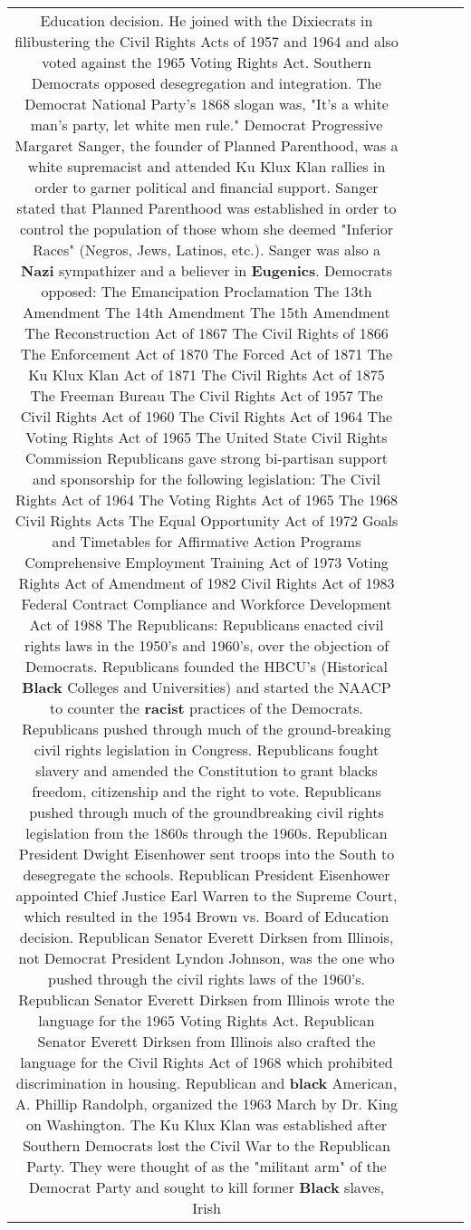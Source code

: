 \documentclass[11pt]{article}
\newlength\mylength
\begin{document}
\begin{center}
\begin{longtable}{|C{.65\mylength}|C{.30\mylength}|C{.12\mylength}|C{.12\mylength}|C{.12\mylength}|}
Education decision. He joined with the Dixiecrats in filibustering the Civil Rights Acts of 1957 and 1964 and also voted against the 1965 Voting Rights Act. Southern Democrats opposed desegregation and integration. The Democrat National Party's 1868 slogan was, "It's a white man's party, let white men rule." Democrat Progressive Margaret Sanger, the founder of Planned Parenthood, was a white supremacist and attended Ku Klux Klan rallies in order to garner political and financial support. Sanger stated that Planned Parenthood was established in order to control the population of those whom she deemed "Inferior Races" (Negros, Jews, Latinos, etc.). Sanger was also a \textbf{Nazi} sympathizer and a believer in \textbf{Eugenics}. Democrats opposed: The Emancipation Proclamation The 13th Amendment The 14th Amendment The 15th Amendment The Reconstruction Act of 1867 The Civil Rights of 1866 The Enforcement Act of 1870 The Forced Act of 1871 The Ku Klux Klan Act of 1871 The Civil Rights Act of 1875 The Freeman Bureau The Civil Rights Act of 1957 The Civil Rights Act of 1960 The Civil Rights Act of 1964 The Voting Rights Act of 1965 The United State Civil Rights Commission Republicans gave strong bi-partisan support and sponsorship for the following legislation: The Civil Rights Act of 1964 The Voting Rights Act of 1965 The 1968 Civil Rights Acts The Equal Opportunity Act of 1972 Goals and Timetables for Affirmative Action Programs Comprehensive Employment Training Act of 1973 Voting Rights Act of Amendment of 1982 Civil Rights Act of 1983 Federal Contract Compliance and Workforce Development Act of 1988 The Republicans: Republicans enacted civil rights laws in the 1950's and 1960's, over the objection of Democrats. Republicans founded the HBCU's (Historical \textbf{Black} Colleges and Universities) and started the NAACP to counter the \textbf{racist} practices of the Democrats. Republicans pushed through much of the ground-breaking civil rights legislation in Congress. Republicans fought slavery and amended the Constitution to grant blacks freedom, citizenship and the right to vote. Republicans pushed through much of the groundbreaking civil rights legislation from the 1860s through the 1960s. Republican President Dwight Eisenhower sent troops into the South to desegregate the schools. Republican President Eisenhower appointed Chief Justice Earl Warren to the Supreme Court, which resulted in the 1954 Brown vs. Board of Education decision. Republican Senator Everett Dirksen from Illinois, not Democrat President Lyndon Johnson, was the one who pushed through the civil rights laws of the 1960's. Republican Senator Everett Dirksen from Illinois wrote the language for the 1965 Voting Rights Act. Republican Senator Everett Dirksen from Illinois also crafted the language for the Civil Rights Act of 1968 which prohibited discrimination in housing. Republican and \textbf{black} American, A. Phillip Randolph, organized the 1963 March by Dr. King on Washington. The Ku Klux Klan was established after Southern Democrats lost the Civil War to the Republican Party. They were thought of as the "militant arm" of the Democrat Party and sought to kill former \textbf{Black} slaves, Irish 
\end{longtable}
\end{center}
\end{document}

